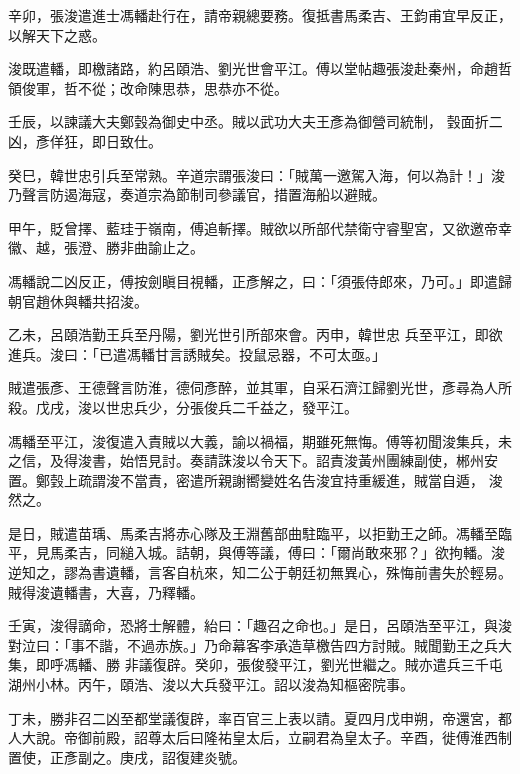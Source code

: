 \begin{pinyinscope}
 辛卯，張浚遣進士馮轓赴行在，請帝親總要務。復抵書馬柔吉、王鈞甫宜早反正，以解天下之惑。



 浚既遣轓，即檄諸路，約呂頤浩、劉光世會平江。傅以堂帖趣張浚赴秦州，命趙哲領俊軍，哲不從；改命陳思恭，思恭亦不從。



 壬辰，以諫議大夫鄭瑴為御史中丞。賊以武功大夫王彥為御營司統制，
 瑴面折二凶，彥佯狂，即日致仕。



 癸巳，韓世忠引兵至常熟。辛道宗謂張浚曰：「賊萬一邀駕入海，何以為計！」浚乃聲言防遏海寇，奏道宗為節制司參議官，措置海船以避賊。



 甲午，貶曾擇、藍珪于嶺南，傅追斬擇。賊欲以所部代禁衛守睿聖宮，又欲邀帝幸徽、越，張澄、勝非曲諭止之。



 馮轓說二凶反正，傅按劍瞋目視轓，正彥解之，曰：「須張侍郎來，乃可。」即遣歸朝官趙休與轓共招浚。



 乙未，呂頤浩勤王兵至丹陽，劉光世引所部來會。丙申，韓世忠
 兵至平江，即欲進兵。浚曰：「已遣馮轓甘言誘賊矣。投鼠忌器，不可太亟。」



 賊遣張彥、王德聲言防淮，德伺彥醉，並其軍，自采石濟江歸劉光世，彥尋為人所殺。戊戌，浚以世忠兵少，分張俊兵二千益之，發平江。



 馮轓至平江，浚復遣入責賊以大義，諭以禍福，期雖死無悔。傅等初聞浚集兵，未之信，及得浚書，始悟見討。奏請誅浚以令天下。詔責浚黃州團練副使，郴州安置。鄭瑴上疏謂浚不當責，密遣所親謝嚮變姓名告浚宜持重緩進，賊當自遁，
 浚然之。



 是日，賊遣苗瑀、馬柔吉將赤心隊及王淵舊部曲駐臨平，以拒勤王之師。馮轓至臨平，見馬柔吉，同縋入城。詰朝，與傅等議，傅曰：「爾尚敢來邪？」欲拘轓。浚逆知之，謬為書遺轓，言客自杭來，知二公于朝廷初無異心，殊悔前書失於輕易。賊得浚遺轓書，大喜，乃釋轓。



 壬寅，浚得謫命，恐將士解體，紿曰：「趣召之命也。」是日，呂頤浩至平江，與浚對泣曰：「事不諧，不過赤族。」乃命幕客李承造草檄告四方討賊。賊聞勤王之兵大集，即呼馮轓、勝
 非議復辟。癸卯，張俊發平江，劉光世繼之。賊亦遣兵三千屯湖州小林。丙午，頤浩、浚以大兵發平江。詔以浚為知樞密院事。



 丁未，勝非召二凶至都堂議復辟，率百官三上表以請。夏四月戊申朔，帝還宮，都人大說。帝御前殿，詔尊太后曰隆祐皇太后，立嗣君為皇太子。辛酉，徙傅淮西制置使，正彥副之。庚戌，詔復建炎號。




\end{pinyinscope}
